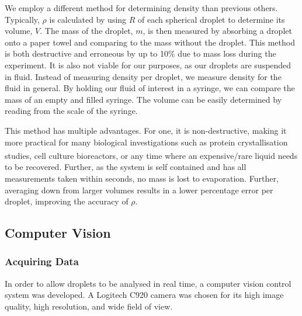 \documentclass{physics_article_B}
\begin{document}
        We employ a different method for determining density than previous others. Typically, $\rho$ is calculated by using $R$ of each spherical droplet to determine its volume, $V$. The mass of the droplet, $m$, is then measured by absorbing a droplet onto a paper towel and comparing to the mass without the droplet\cite{hill}. This method is both destructive and erroneous by up to 10\%\cite{harrold2} due to mass loss during the experiment. It is also not viable for our purposes, as our droplets are suspended in fluid. 
        Instead of measuring density per droplet, we measure density for the fluid in general. By holding our fluid of interest in a syringe, we can compare the mass of an empty and filled syringe. The volume can be easily determined by reading from the scale of the syringe.
    
        This method has multiple advantages. For one, it is non-destructive, making it more practical for many biological investigations such as protein crystallisation  studies\textsuperscript{\cite{zhu}}, cell culture bioreactors\textsuperscript{\cite{konry}}, or any time where an expensive/rare liquid needs to be recovered\cite{Backholm2017}. Further, as the system is self contained and has all measurements taken within seconds, no mass is lost to evaporation. Further, averaging down from larger volumes results in a lower percentage error per droplet, improving the accuracy of $\rho$.
        
    \subsection{Computer Vision\label{sect:method:vision}}
        
        \subsubsection{Acquiring Data\label{sect:method:vision:acquire}}
            In order to allow droplets to be analysed in real time, a computer vision control system was developed. A Logitech C920 camera was chosen for its high image quality, high resolution, and wide field of view. 
            
\end{document}
